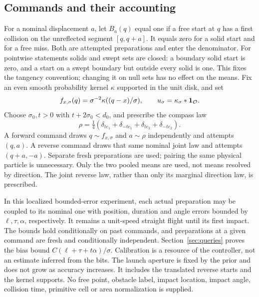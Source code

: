 \subsection{Commands and their accounting}
For a nominal displacement $a$, let $B_a(q)$ equal one if a free start
at $q$ has a first collision on the unreflected segment $[q,q+a]$.
It equals zero for a solid start and for a free miss. Both are attempted
preparations and enter the denominator. For pointwise statements solids
and swept sets are closed: a boundary solid start is zero, and a start
on a swept boundary but outside every solid is one. This fixes the
tangency convention; changing it on null sets has no effect on the means.
Fix an even smooth probability kernel $\kappa$ supported in the unit disk,
and set
\[
 f_{x,\sigma}(q)=\sigma^{-2}\kappa((q-x)/\sigma),\qquad
 u_\sigma=\kappa_\sigma*\mathbf 1_\mathcal O.
\]
Choose $\sigma_0,t>0$ with $t+2\sigma_0<d_0$, and prescribe the compass
law
\begin{equation}\label{eq:compass}
 \rho=\tfrac14(\delta_{te_1}+\delta_{-te_1}
                         +\delta_{te_2}+\delta_{-te_2}).
\end{equation}
A forward command draws $q\sim f_{x,\sigma}$ and $a\sim\rho$
independently and attempts $(q,a)$. A reverse command draws that same
nominal joint law and attempts $(q+a,-a).$ Separate fresh preparations
are used; pairing the same physical particle is unnecessary. Only the
two pooled means are used, not means resolved by direction. The joint
reverse law, rather than only its marginal direction law, is prescribed.

In this localized bounded-error experiment, each actual preparation may be coupled to its nominal one with position,
duration and angle errors bounded by $\ell,\tau,\alpha$, respectively.
It remains a unit-speed straight flight until its first impact. The
bounds hold conditionally on past commands, and preparations at a given
command are fresh and conditionally independent. Section~\ref{sec:queries}
proves the bias bound $C(\ell+\tau+t\alpha)/\sigma$. Calibration is a
resource of the controller, not an estimate inferred from the bits.
The launch aperture is fixed by the prior and does not grow as accuracy
increases. It includes the translated reverse starts and the kernel
supports. No free point, obstacle label, impact location, impact angle,
collision time, primitive cell or area normalization is supplied.

